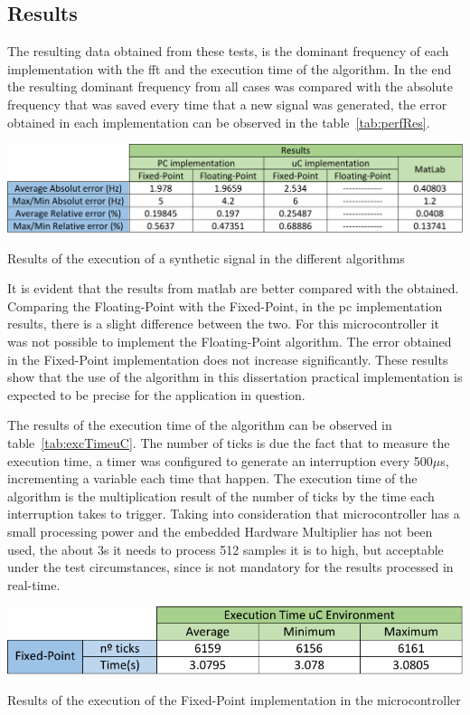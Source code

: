 \subsection{Results}
The resulting data obtained from these tests, is the dominant frequency of each implementation with the \acrshort{fft} and the execution time of the algorithm. In the end the resulting dominant frequency from all cases was compared with the absolute frequency that was saved every time that a new signal was generated, the error obtained in each implementation can be observed in the table~\ref{tab:perfRes}.
\begin{table}
    \centering
    \includegraphics[width=1\textwidth]{Chapters/6CHP/Figures/performanceAlgorithm.pdf}
    \caption{Results of the execution of a synthetic signal in the different algorithms}
    \label{tab:perfRes}
\end{table}
It is evident that the results from \acrshort{matlab} are better compared with the obtained. Comparing the Floating-Point with the Fixed-Point, in the \acrshort{pc} implementation results, there is a slight difference between the two. For this microcontroller it was not possible to
implement the Floating-Point algorithm. The error obtained in the Fixed-Point implementation does not increase significantly. These results show that the use of the algorithm in this dissertation practical implementation is expected to be precise for the application in question.

The results of the execution time of the algorithm can be observed in table~\ref{tab:excTimeuC}. The number of ticks is due the fact that to measure the execution time, a timer was configured to generate an interruption every 500$\mu$s, incrementing a variable each time that happen.
The execution time of the algorithm is the multiplication result of the number of ticks by the time each interruption takes to trigger. Taking into consideration that microcontroller has a small processing power and the embedded Hardware Multiplier has not been used, the about 3s it needs to process 512 samples it is to high, but acceptable under the test circumstances, since is not mandatory for the results processed in real-time.  
\begin{table}
    \centering
    \includegraphics[width=1\textwidth]{Chapters/6CHP/Figures/excTimeuC.pdf}
    \caption{Results of the execution of the Fixed-Point implementation in the microcontroller}
    \label{tab:excTimeuC}
\end{table}
